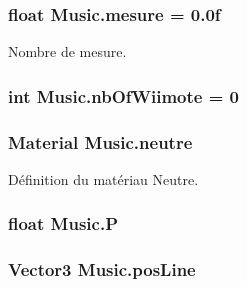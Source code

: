 \subsubsection[{mesure}]{\setlength{\rightskip}{0pt plus 5cm}float Music.\+mesure = 0.\+0f\hspace{0.3cm}{\ttfamily [private]}}\label{class_music_adf436d51d0b5be109beae967b4d34522}


Nombre de mesure. 

\hypertarget{class_music_a4d9b6dba41b560393edf85a675e8a84f}{}
\subsubsection[{nb\+Of\+Wiimote}]{\setlength{\rightskip}{0pt plus 5cm}int Music.\+nb\+Of\+Wiimote = 0\hspace{0.3cm}{\ttfamily [private]}}\label{class_music_a4d9b6dba41b560393edf85a675e8a84f}
\hypertarget{class_music_ac4412a8635c49f90692e3683931c0343}{}
\subsubsection[{neutre}]{\setlength{\rightskip}{0pt plus 5cm}Material Music.\+neutre\hspace{0.3cm}{\ttfamily [private]}}\label{class_music_ac4412a8635c49f90692e3683931c0343}


Définition du matériau Neutre. 

\hypertarget{class_music_a8811033babcd7646e477060f69d578e6}{}
\subsubsection[{P}]{\setlength{\rightskip}{0pt plus 5cm}float Music.\+P\hspace{0.3cm}{\ttfamily [private]}}\label{class_music_a8811033babcd7646e477060f69d578e6}
\hypertarget{class_music_a8dee10ad61d1260dc55195c7a7c50d7c}{}
\subsubsection[{pos\+Line}]{\setlength{\rightskip}{0pt plus 5cm}Vector3 Music.\+pos\+Line\hspace{0.3cm}{\ttfamily [private]}}\label{class_music_a8dee10ad61d1260dc55195c7a7c50d7c}


